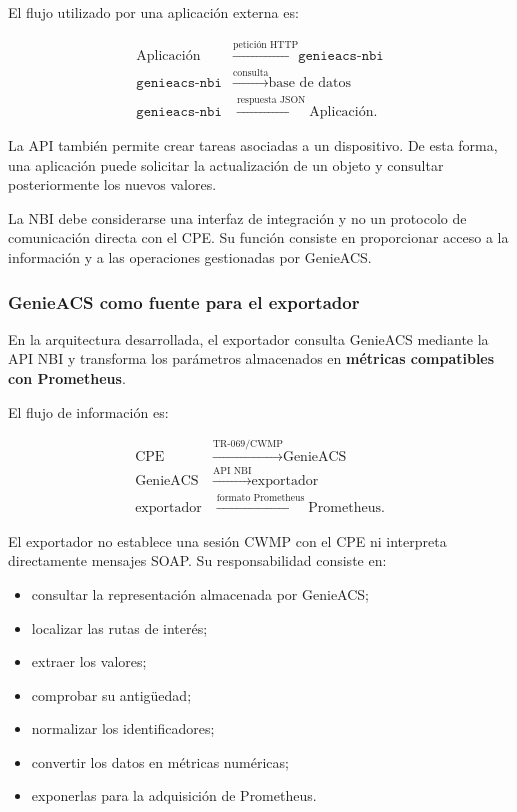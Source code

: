 El flujo utilizado por una aplicación externa es:

\[
\begin{aligned}
    \text{Aplicación}
    &\xrightarrow{\text{petición HTTP}}
    \texttt{genieacs-nbi}\\
    \texttt{genieacs-nbi}
    &\xrightarrow{\text{consulta}}
    \text{base de datos}\\
    \texttt{genieacs-nbi}
    &\xrightarrow{\text{respuesta JSON}}
    \text{Aplicación}.
\end{aligned}
\]

La API también permite crear tareas asociadas a un dispositivo. De esta
forma, una aplicación puede solicitar la actualización de un objeto y
consultar posteriormente los nuevos valores.

La NBI debe considerarse una interfaz de integración y no un protocolo de
comunicación directa con el CPE. Su función consiste en proporcionar
acceso a la información y a las operaciones gestionadas por GenieACS.


\subsubsection*{GenieACS como fuente para el exportador}

En la arquitectura desarrollada, el exportador consulta GenieACS mediante
la API NBI y transforma los parámetros almacenados en
\textbf{métricas compatibles con Prometheus}.

El flujo de información es:

\[
\begin{aligned}
    \text{CPE}
    &\xrightarrow{\text{TR-069/CWMP}}
    \text{GenieACS}\\
    \text{GenieACS}
    &\xrightarrow{\text{API NBI}}
    \text{exportador}\\
    \text{exportador}
    &\xrightarrow{\text{formato Prometheus}}
    \text{Prometheus}.
\end{aligned}
\]

El exportador no establece una sesión CWMP con el CPE ni interpreta
directamente mensajes SOAP. Su responsabilidad consiste en:

\begin{itemize}
    \item consultar la representación almacenada por GenieACS;
    \item localizar las rutas de interés;
    \item extraer los valores;
    \item comprobar su antigüedad;
    \item normalizar los identificadores;
    \item convertir los datos en métricas numéricas;
    \item exponerlas para la adquisición de Prometheus.
\end{itemize}

